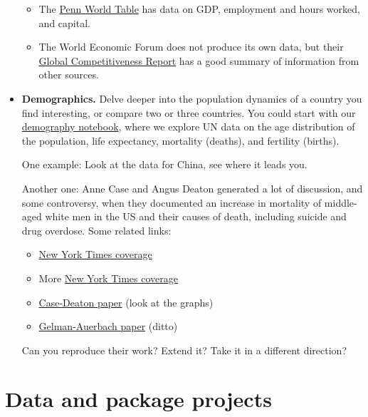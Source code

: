 \documentclass[11pt]{article}
\begin{document}
\begin{itemize}
\begin{itemize}
\item The \href{http://www.rug.nl/research/ggdc/data/pwt/}{Penn World Table} 
has data on GDP, employment and hours worked,
and capital.  

\item The World Economic Forum does not produce its own data, 
but their 
\href{http://reports.weforum.org/global-competitiveness-report-2015-2016/}
{Global Competitiveness Report} 
has a good summary of information from other sources.  
\end{itemize} 

\item {\bf Demographics.\/} Delve deeper into the population dynamics of a country
you find interesting, or compare two or three countries.
You could start with our
\href{https://github.com/DaveBackus/Data_Bootcamp/blob/master/Code/Lab/UN_demography.ipynb}
{demography notebook},
where we explore UN data on
the age distribution of the population, life expectancy, mortality (deaths), and fertility (births).

One example:  Look at the data for China, see where it leads you.  

Another one:  Anne Case and Angus Deaton generated a lot of discussion, 
and some controversy, when they documented an increase in mortality of middle-aged white men in the US
and their causes of death, including suicide and drug overdose.
Some related links:  
%
\begin{itemize} 
\item
\href{http://www.nytimes.com/2015/11/03/health/death-rates-rising-for-middle-aged-white-americans-study-finds.html}
    {New York Times coverage}

\item More
\href{http://www.nytimes.com/2015/11/07/upshot/more-details-on-rising-mortality-among-middle-aged-whites.html}
    {New York Times coverage}

\item \href{http://www.pnas.org/content/112/49/15078.full.pdf}{Case-Deaton paper} (look at the graphs) 

\item \href{http://andrewgelman.com/wp-content/uploads/2017/04/ageadj.pdf}{Gelman-Auerbach paper} (ditto)

\end{itemize} 
Can you reproduce their work?  Extend it?  Take it in a different direction?
\end{itemize}


\section*{Data and package projects}
\end{document}
